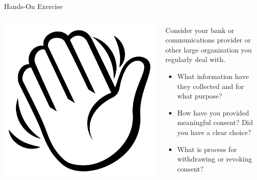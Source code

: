 \documentclass[ignorenonframetext,xcolor=x11names]{beamer}
\begin{document}
 \begin{frame}{Hands-On Exercise}
 \begin{columns}
\begin{column}{0.2\textwidth}
\href{https://commons.wikimedia.org/wiki/File:Emojione_BW_1F44B.svg}{\includegraphics[width=\textwidth]{hand.png}}
\end{column}
\begin{column}{0.8\textwidth}

Consider your bank or communications provider or other large organization you regularly deal with. 
\begin{itemize}
  \item What information have they collected and for what purpose?
  \item How have you provided meaningful consent? Did you have a clear choice?
  \item What is process for withdrawing or revoking consent?
\end{itemize}
\end{column}
\end{columns}
\end{frame}
\end{document}
